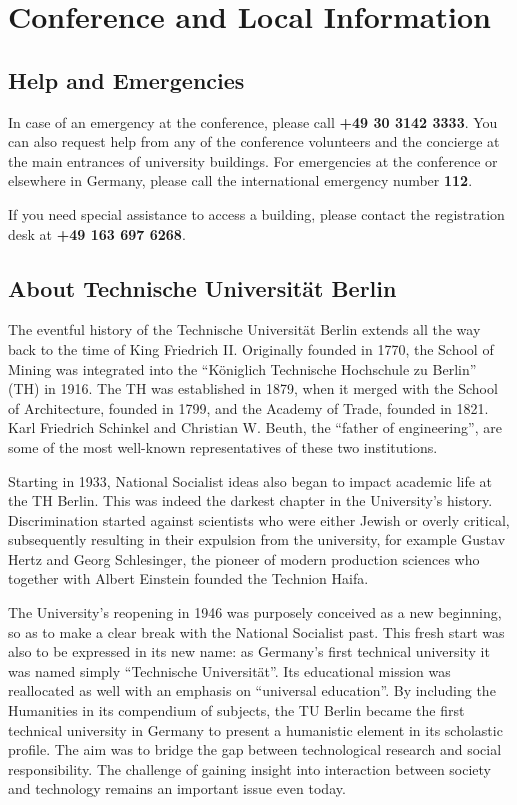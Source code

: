 \chapter{Conference and Local Information}

\setlength\fboxsep{0pt}
\setlength\fboxrule{0.5pt}
 \section{Help and Emergencies}

In case of an emergency at the conference, please call {\Large \textbf{ +49 30 3142 3333}}. You can also request help from any of the conference volunteers and the concierge  at the main entrances of university buildings. For emergencies at the conference or elsewhere in Germany, please call the international emergency number {\Large \textbf{112}}. 

If you need special assistance to access a building, please contact the registration desk at {\Large \textbf{ +49 163 697 6268}}.


 \section{About Technische Universit\"at Berlin}

The eventful history of the Technische Universität Berlin extends all the way back to the time of King Friedrich II. Originally founded in 1770, the School of Mining was integrated into the ``Königlich Technische Hochschule zu Berlin'' (TH) in 1916. The TH was established in 1879, when it merged with the School of Architecture, founded in 1799, and the Academy of Trade, founded in 1821. Karl Friedrich Schinkel and Christian W. Beuth, the ``father of engineering'', are some of the most well-known representatives of these two institutions.

Starting in 1933, National Socialist ideas also began to impact academic life at the TH Berlin. This was indeed the darkest chapter in the University's history. Discrimination started against scientists who were either Jewish or overly critical, subsequently resulting in their expulsion from the university, for example Gustav Hertz and Georg Schlesinger, the pioneer of modern production sciences who together with Albert Einstein founded the Technion Haifa.

The University’s reopening in 1946 was purposely conceived as a new beginning, so as to make a clear break with the National Socialist past. This fresh start was also to be expressed in its new name: as Germany’s first technical university it was named simply ``Technische Universität''. Its educational mission was reallocated as well with an emphasis on ``universal education''. By including the Humanities in its compendium of subjects, the TU Berlin became the first technical university in Germany to present a humanistic element in its scholastic profile. The aim was to bridge the gap between technological research and social responsibility. The challenge of gaining insight into interaction between society and technology remains an important issue even today.


